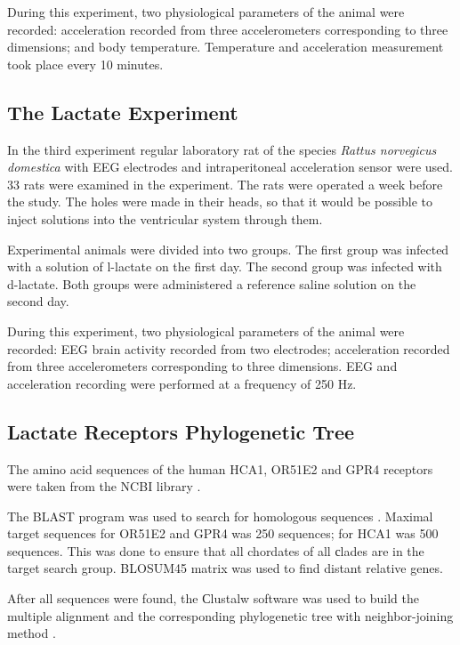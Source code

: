\documentclass[14pt,a4paper]{scrartcl}
\begin{document}
During this experiment, two physiological parameters of the animal were recorded: acceleration recorded from three accelerometers corresponding to three dimensions; and body temperature. Temperature and acceleration measurement took place every 10 minutes.





\subsection{The Lactate Experiment}
\label{sec:Methods:The Lactate Experiment}

In the third experiment regular laboratory rat of the species \textit{Rattus norvegicus domestica} with EEG electrodes and intraperitoneal acceleration sensor were used. 33 rats were examined in the experiment. The rats were operated a week before the study. The holes were made in their heads, so that it would be possible to inject solutions into the ventricular system through them. 

Experimental animals were divided into two groups. The first group was infected with a solution of l-lactate on the first day. The second group was infected with d-lactate.  Both groups were administered a reference saline solution on the second day. 

During this experiment, two physiological parameters of the animal were recorded: EEG brain activity recorded from two electrodes; acceleration recorded from three accelerometers corresponding to three dimensions. EEG and acceleration recording were performed at a frequency of 250 Hz. 




\subsection{Lactate Receptors Phylogenetic Tree}
\label{sec:Methods:Lactate Receptors Phylogenetic Tree}

The amino acid sequences of the human HCA1, OR51E2 and GPR4 receptors were taken from the NCBI library \citep{Pruitt2007}. 

The BLAST program was used to search for homologous sequences \citep{Altschul1997}. Maximal target sequences for OR51E2 and GPR4 was 250 sequences; for HCA1 was 500 sequences. This was done to ensure that all chordates of all сlades are in the target search group. BLOSUM45 matrix was used to find distant relative genes. 

After all sequences were found, the Сlustalw software was used to build the multiple alignment and the corresponding phylogenetic tree with neighbor-joining method \citep{Thomopson1994,Saitou1987}. 
\end{document}
